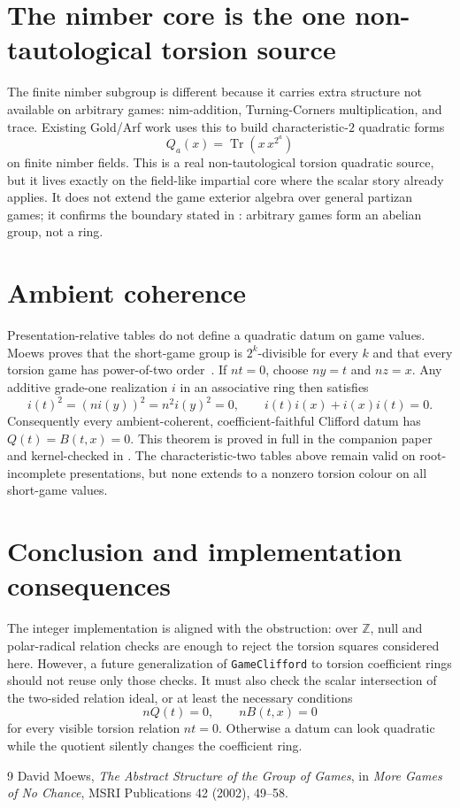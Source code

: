 \documentclass[11pt]{article}
\theoremstyle{remark}
\newcommand{\Z}{\mathbb{Z}}
\begin{document}
\section{The nimber core is the one non-tautological torsion source}

The finite nimber subgroup is different because it carries extra structure not
available on arbitrary games: nim-addition, Turning-Corners multiplication, and
trace.  Existing Gold/Arf work uses this to build characteristic-$2$ quadratic
forms
\[
  Q_a(x)=\operatorname{Tr}(x\,x^{2^a})
\]
on finite nimber fields.  This is a real non-tautological torsion quadratic
source, but it lives exactly on the field-like impartial core where the scalar
story already applies.  It does not extend the game exterior algebra over
general partizan games; it confirms the boundary stated in
: arbitrary games form an abelian group, not a
ring.

\section{Ambient coherence}

Presentation-relative tables do not define a quadratic datum on game values.
Moews proves that the short-game group is $2^k$-divisible for every $k$ and
that every torsion game has power-of-two order~\cite{moews}. If $nt=0$, choose
$ny=t$ and $nz=x$. Any additive grade-one realization $i$ in an associative
ring then satisfies
\[
 i(t)^2=(ni(y))^2=n^2i(y)^2=0,
 \qquad
 i(t)i(x)+i(x)i(t)=0.
\]
Consequently every ambient-coherent, coefficient-faithful Clifford datum has
$Q(t)=B(t,x)=0$. This theorem is proved in full in the companion paper
 and kernel-checked in
. The characteristic-two tables above
remain valid on root-incomplete presentations, but none extends to a nonzero
torsion colour on all short-game values.

\section{Conclusion and implementation consequences}

The integer implementation is aligned with the obstruction:
over $\Z$, null and polar-radical relation checks are enough to reject the
torsion squares considered here.  However, a future
generalization of \texttt{GameClifford} to torsion coefficient rings should not
reuse only those checks.  It must also check the scalar intersection of the
two-sided relation ideal, or at least the necessary conditions
\[
  nQ(t)=0,\qquad nB(t,x)=0
\]
for every visible torsion relation $nt=0$.  Otherwise a datum can look
quadratic while the quotient silently changes the coefficient ring.

\begin{thebibliography}{9}
David Moews,
\emph{The Abstract Structure of the Group of Games},
in \emph{More Games of No Chance}, MSRI Publications 42 (2002), 49--58.
\end{thebibliography}
\end{document}
